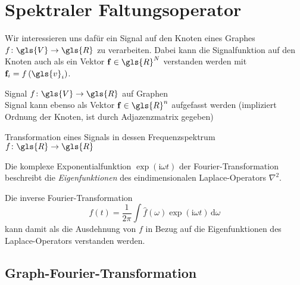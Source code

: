 \section{Spektraler Faltungsoperator}
\label{spektraler_faltungsoperator}

Wir interessieren uns dafür ein Signal auf den Knoten eines Graphes $f \colon \gls{V} \to \gls{R}$ zu verarbeiten.
Dabei kann die Signalfunktion auf den Knoten auch als ein Vektor $\ve{f} \in \gls{R}^N$ verstanden werden mit $\ve{f}_i = f\left(\gls{v}_i\right)$.

Signal $f \colon \gls{V} \to \gls{R}$ auf Graphen\\
Signal kann ebenso als Vektor $\ve{f} \in \gls{R}^n$ aufgefasst werden (impliziert Ordnung der Knoten, ist durch Adjazenzmatrix gegeben)\\

\cite{Shuman}
\cite{Defferrard}
\cite{Hammond}

Transformation eines Signals in dessen Frequenzspektrum $f \colon \gls{R} \to \gls{R}$

Die komplexe Exponentialfunktion $\exp\left(\mathrm{i}\omega t\right)$ der Fourier-Transformation beschreibt die \emph{Eigenfunktionen} des eindimensionalen Laplace-Operators $\nabla^2$.

Die inverse Fourier-Transformation
\begin{equation}
  f\left(t\right) = \frac{1}{2\pi} \int \hat f\left(\omega\right) \exp\left(\mathrm{i}\omega t\right)\,\mathrm{d}\omega
\end{equation}
kann damit als die Ausdehnung von $f$ in Bezug auf die Eigenfunktionen des Laplace-Operators verstanden werden.

\subsection{Graph-Fourier-Transformation}
\label{graph_fourier_transformation}

